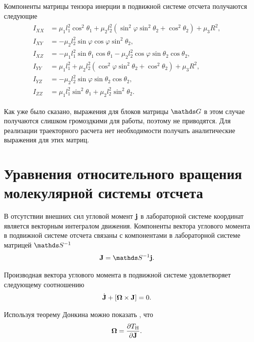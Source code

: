 Компоненты матрицы тензора инерции в подвижной системе отсчета получаются следующие
\begin{gather}
    \begin{aligned}
        I_{XX} &= \mu_1 l_1^2 \cos^2 \theta_1 + \mu_2 l_2^2 (\sin^2 \varphi \sin^2 \theta_2 + \cos^2 \theta_2) + \mu_3 R^2, \\ 
        I_{XY} &= -\mu_2 l_2^2 \sin \varphi \cos \varphi \sin^2 \theta_2, \\ 
        I_{XZ} &= -\mu_1 l_1^2 \sin \theta_1 \cos \theta_1 - \mu_2 l_2^2 \cos \varphi \sin \theta_2 \cos \theta_2, \\
        I_{YY} &= \mu_1 l_1^2 + \mu_2 l_2^2 (\cos^2 \varphi \sin^2 \theta_2 + \cos^2 \theta_2) + \mu_3 R^2, \\
        I_{YZ} &= -\mu_2 l_2^2 \sin \varphi \sin \theta_2 \cos \theta_2, \\
        I_{ZZ} &= \mu_1 l_1^2 \sin^2 \theta_1 + \mu_2 l_2^2 \sin^2 \theta_2.  
    \end{aligned} 
\end{gather}

Как уже было сказано, выражения для блоков матрицы $\bbG$ в этом случае получаются слишком громоздкими для работы, поэтому не приводятся. Для реализации траекторного расчета нет необходимости получать аналитические выражения для этих матриц. 

\section{Уравнения относительного вращения молекулярной системы отсчета} \label{section:rotational-dynamics}

В отсутствии внешних сил угловой момент $\mathbf{j}$ в лабораторной системе координат является векторным интегралом движения. Компоненты вектора углового момента в подвижной системе отсчета связаны с компонентами в лабораторной системе матрицей $\bbS^{-1}$
\begin{gather}
    \mf{J} = \bbS^{-1} \mf{j}. \label{polyatom-j-connection}
\end{gather}

Производная вектора углового момента в подвижной системе удовлетворяет следующему соотношению \cite{goldstein}
\begin{gather}
    \dot{\mathbf{J}} + \left[ \boldsymbol{\Omega} \times \mathbf{J} \right] = 0.
\end{gather}

Используя теорему Донкина можно показать \cite{petrov2015}, что 
\begin{gather}
    \boldsymbol{\Omega} = \frac{\partial T_\text{H}}{\partial \mathbf{J}}. 
\end{gather}

